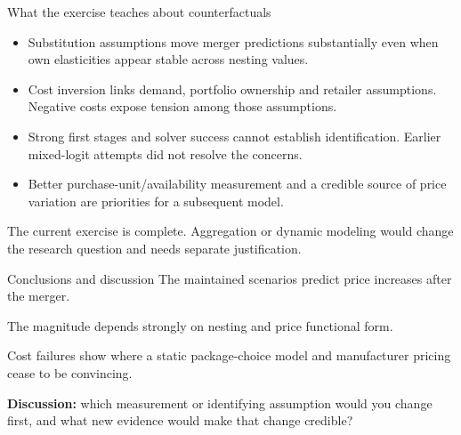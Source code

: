 \documentclass[aspectratio=169,11pt]{beamer}
\newcommand{\source}[1]{\par\vfill{\tiny\color{gray}#1}}
\begin{document}
\begin{frame}{What the exercise teaches about counterfactuals}
\begin{itemize}\setlength\itemsep{4mm}
\item Substitution assumptions move merger predictions substantially even when own elasticities appear stable across nesting values.
\item Cost inversion links demand, portfolio ownership and retailer assumptions. Negative costs expose tension among those assumptions.
\item Strong first stages and solver success cannot establish identification. Earlier mixed-logit attempts did not resolve the concerns.
\item Better purchase-unit/availability measurement and a credible source of price variation are priorities for a subsequent model.
\end{itemize}
\source{The current exercise is complete. Aggregation or dynamic modeling would change the research question and needs separate justification.}
\end{frame}

\begin{frame}{Conclusions and discussion}
\large
The maintained scenarios predict price increases after the merger.\par\medskip
The magnitude depends strongly on nesting and price functional form.\par\medskip
Cost failures show where a static package-choice model and manufacturer pricing cease to be convincing.\par\bigskip
\normalsize
\textbf{Discussion:} which measurement or identifying assumption would you change first, and what new evidence would make that change credible?
\end{frame}
\end{document}
